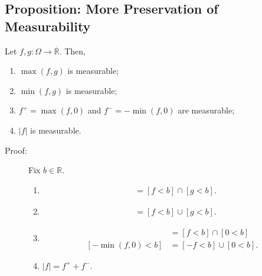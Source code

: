 \documentclass[9pt]{extarticle}
\newcommand{\R}{\mathbb{R}}
\begin{document}
  \subsection{Proposition: More Preservation of Measurability}%
  Let $f,g:\Omega \rightarrow \overline{\R}$. Then,
  \begin{enumerate}[(1)]
    \item $\max(f,g)$ is measurable;
    \item $\min(f,g)$ is measurable;
    \item $f^{+} = \max(f,0)$ and $f^{-} = -\min(f,0)$ are measurable;
    \item $|f|$ is measurable.
  \end{enumerate}
  \begin{description}
    \item[Proof:] Fix $b\in \R$.
      \begin{enumerate}[(1)]
        \item
          \begin{align*}
            [\max(f,g) < b] &= [f < b]\cap [g < b].
          \end{align*}
        \item
          \begin{align*}
            [\min(f,g) < b] &= [f < b]\cup [g < b].
          \end{align*}
        \item 
          \begin{align*}
            [\max(f,0) < b] &= [f < b]\cap [0 < b]\\
            [-\min(f,0) < b] &= [-f < b] \cup [0 < b].
          \end{align*}
        \item $|f| = f^{+} + f^{-}$.
      \end{enumerate}
  \end{description}
\end{document}
